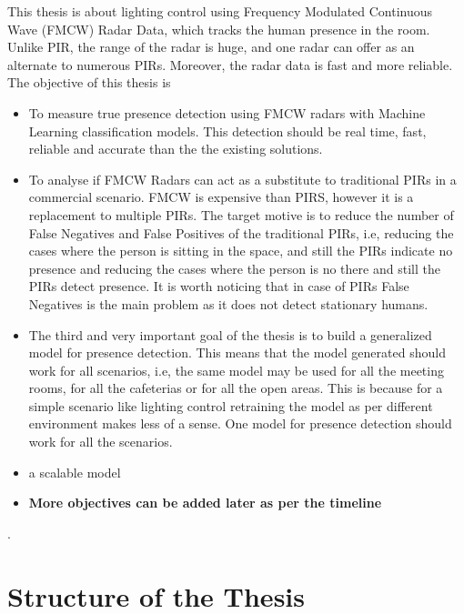 This thesis is about lighting control using Frequency Modulated Continuous Wave (FMCW) Radar Data, which tracks the human presence in the room. 
Unlike PIR, the range of the radar is huge, and one radar can offer as an alternate to numerous PIRs. Moreover, the radar data is fast and more reliable. The objective of this thesis is 
\begin{itemize}
    \item To measure true presence detection using FMCW radars with Machine Learning classification models. This detection should be real time, fast, reliable and accurate than the the existing solutions.
    \item To analyse if FMCW Radars can act as a substitute to traditional PIRs in a commercial scenario. FMCW is expensive than PIRS, however it is a replacement to multiple PIRs. The target motive is to reduce the number of False Negatives and False Positives of the traditional PIRs, i.e, reducing the cases where the person is sitting in the space, and still the PIRs indicate no presence and reducing the cases where the person is no there and still the PIRs detect presence. It is worth noticing that in case of PIRs False Negatives is the main problem as it does not detect stationary humans. 
    \item The third and very important goal of the thesis is to build a generalized model for presence detection. This means that the model generated should work for all scenarios, i.e, the same model may be used for all the meeting rooms, for all the cafeterias or for all the open areas. This is because for a simple scenario like lighting control retraining the model as per different environment makes less of a sense. One model for presence detection should work for all the scenarios.
    \item a scalable model
    \item \textbf{More objectives can be added later as per the timeline}
\end{itemize}.


\section{Structure of the Thesis}
\label{section:structure} 


